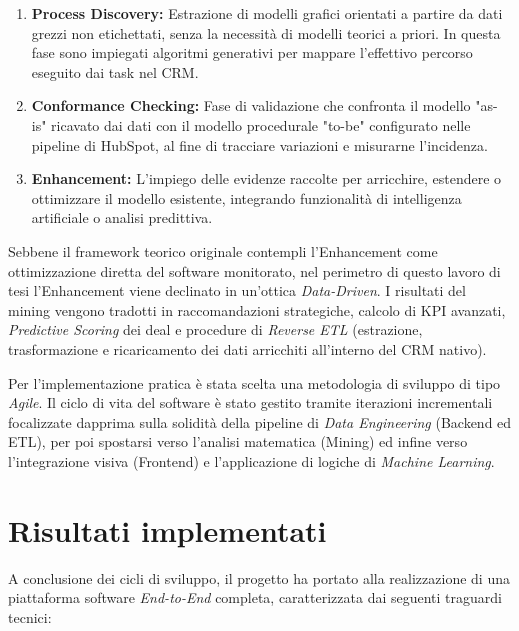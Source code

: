 \documentclass[12pt, a4paper]{report}
\begin{document}
\begin{enumerate}
    \item \textbf{Process Discovery:} Estrazione di modelli grafici orientati a partire da dati grezzi non etichettati, senza la necessità di modelli teorici a priori. In questa fase sono impiegati algoritmi generativi per mappare l'effettivo percorso eseguito dai task nel CRM.
    \item \textbf{Conformance Checking:} Fase di validazione che confronta il modello "as-is" ricavato dai dati con il modello procedurale "to-be" configurato nelle pipeline di HubSpot, al fine di tracciare variazioni e misurarne l'incidenza.
    \item \textbf{Enhancement:} L'impiego delle evidenze raccolte per arricchire, estendere o ottimizzare il modello esistente, integrando funzionalità di intelligenza artificiale o analisi predittiva.
\end{enumerate}

Sebbene il framework teorico originale contempli l'Enhancement come ottimizzazione diretta del software monitorato, nel perimetro di questo lavoro di tesi l'Enhancement viene declinato in un'ottica \textit{Data-Driven}. I risultati del mining vengono tradotti in raccomandazioni strategiche, calcolo di KPI avanzati, \textit{Predictive Scoring} dei deal e procedure di \textit{Reverse ETL} (estrazione, trasformazione e ricaricamento dei dati arricchiti all'interno del CRM nativo).

Per l'implementazione pratica è stata scelta una metodologia di sviluppo di tipo \textit{Agile}. Il ciclo di vita del software è stato gestito tramite iterazioni incrementali focalizzate dapprima sulla solidità della pipeline di \textit{Data Engineering} (Backend ed ETL), per poi spostarsi verso l'analisi matematica (Mining) ed infine verso l'integrazione visiva (Frontend) e l'applicazione di logiche di \textit{Machine Learning}.

\section*{Risultati implementati}
A conclusione dei cicli di sviluppo, il progetto ha portato alla realizzazione di una piattaforma software \textit{End-to-End} completa, caratterizzata dai seguenti traguardi tecnici:
\end{document}
